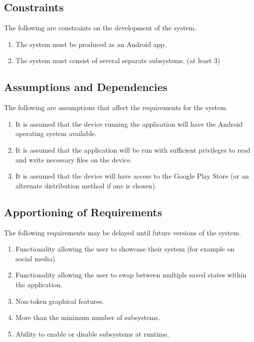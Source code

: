 \documentclass[]{article}
\begin{document}
\subsection{Constraints}
\label{sub:constraints}
	The following are constraints on the development of the system.
	\begin{enumerate}
		\item The system must be produced as an Android app.
		\item The system must consist of several separate subsystems. (at least 3)
	\end{enumerate}

\subsection{Assumptions and Dependencies}
\label{sub:assumptions_and_dependencies}
	The following are assumptions that affect the requirements for the system.
	\begin{enumerate}
	\item It is assumed that the device running the application will have the Android operating system available.
	\item It is assumed that the application will be run with sufficient privileges to read and write necessary files on the device.
	\item  It is assumed that the device will have access to the Google Play Store (or an alternate distribution method if one is chosen).
	\end{enumerate}

\subsection{Apportioning of Requirements}
\label{sub:apportioning_of_requirements}
	The following requirements may be delayed until future versions of the system.
	\begin{enumerate}
		\item Functionality allowing the user to showcase their system (for example on social media).
		\item Functionality allowing the user to swap between multiple saved states within the application.
		\item Non-token graphical features.
		\item More than the minimum number of subsystems.
		\item Ability to enable or disable subsystems at runtime.
	\end{enumerate}
\end{document}
